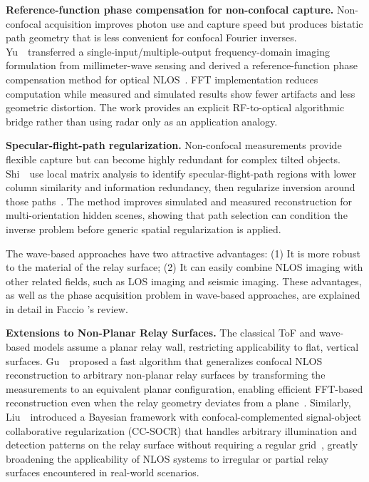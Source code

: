 \vspace{0.8mm}
\noindent \textbf{Reference-function phase compensation for non-confocal capture.}
Non-confocal acquisition improves photon use and capture speed but produces bistatic path geometry that is less convenient for confocal Fourier inverses. Yu~\etal~transferred a single-input/multiple-output frequency-domain imaging formulation from millimeter-wave sensing and derived a reference-function phase compensation method for optical NLOS~\cite{yuNonconfocalPhaseCompensation2026}. FFT implementation reduces computation while measured and simulated results show fewer artifacts and less geometric distortion. The work provides an explicit RF-to-optical algorithmic bridge rather than using radar only as an application analogy.

\vspace{0.8mm}
\noindent \textbf{Specular-flight-path regularization.}
Non-confocal measurements provide flexible capture but can become highly redundant for complex tilted objects. Shi~\etal~use local matrix analysis to identify specular-flight-path regions with lower column similarity and information redundancy, then regularize inversion around those paths~\cite{shiSpecularFlightPathNLOS2026}. The method improves simulated and measured reconstruction for multi-orientation hidden scenes, showing that path selection can condition the inverse problem before generic spatial regularization is applied.

The wave-based approaches have two attractive advantages: (1) It is more robust to the material of the relay surface; (2) It can easily combine NLOS imaging with other related fields, such as LOS imaging and seismic imaging. These advantages, as well as the phase acquisition problem in wave-based approaches, are explained in detail in Faccio \etal's review\cite{faccioNonlineofsightImaging2020}.

\vspace{0.8mm}
\noindent \textbf{Extensions to Non-Planar Relay Surfaces.}
The classical ToF and wave-based models assume a planar relay wall, restricting applicability to flat, vertical surfaces. Gu~\etal~proposed a fast algorithm that generalizes confocal NLOS reconstruction to arbitrary non-planar relay surfaces by transforming the measurements to an equivalent planar configuration, enabling efficient FFT-based reconstruction even when the relay geometry deviates from a plane~\cite{guNonPlanar2023}. Similarly, Liu~\etal~introduced a Bayesian framework with confocal-complemented signal-object collaborative regularization (CC-SOCR) that handles arbitrary illumination and detection patterns on the relay surface without requiring a regular grid~\cite{liuNLOSArbitraryIllumination2023}, greatly broadening the applicability of NLOS systems to irregular or partial relay surfaces encountered in real-world scenarios.

